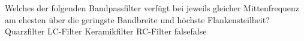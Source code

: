     {Welches der folgenden Bandpassfilter verfügt bei jeweils gleicher Mittenfrequenz am ehesten über die geringste Bandbreite und höchste Flankensteilheit?}
    {Quarzfilter}
    {LC-Filter}
    {Keramikfilter}
    {RC-Filter}
    {false}{false}